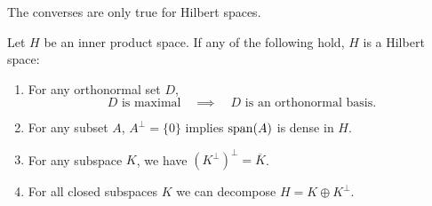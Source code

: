 The converses are only true for Hilbert spaces.
\begin{theorem} \label{criterionHilbertSpace}
Let $H$ be an inner product space. If any of the following hold, $H$ is a Hilbert space:
\begin{enumerate}
\item For any orthonormal set $D$,
\[ \text{$D$ is maximal} \quad\implies\quad \text{$D$ is an orthonormal basis.} \]
\item For any subset $A$, $A^\perp = \{0\}$ implies $\operatorname{span}(A)$ is dense in $H$.
\item For any subspace $K$, we have $(K^\perp)^\perp = \overline{K}$.
\item For all closed subspaces $K$ we can decompose $H = K\oplus K^\perp$.
\end{enumerate}
\end{theorem}
